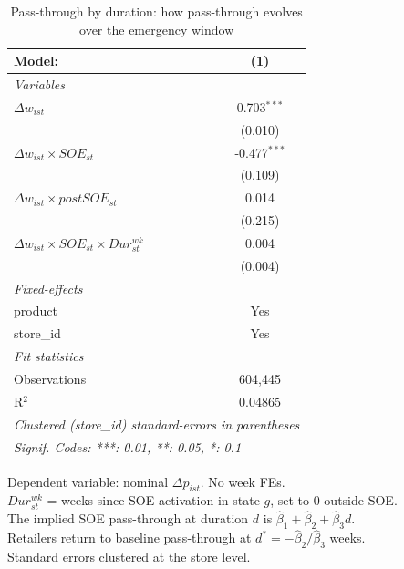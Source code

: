 
\begin{table}[htbp]
   \caption{\label{tab:passthrough_duration} Pass-through by duration: how pass-through evolves over the emergency window}
   \centering
   \begin{tabular}{lc}
      \tabularnewline \midrule \midrule
      Model:                                                   & (1)\\  
      \midrule
      \emph{Variables}\\
      $\Delta w_{ist}$                                         & 0.703$^{***}$\\   
                                                               & (0.010)\\   
      $\Delta w_{ist} \times SOE_{st}$                         & -0.477$^{***}$\\   
                                                               & (0.109)\\   
      $\Delta w_{ist} \times postSOE_{st}$                     & 0.014\\   
                                                               & (0.215)\\   
      $\Delta w_{ist} \times SOE_{st} \times Dur^{wk}_{st}$    & 0.004\\   
                                                               & (0.004)\\   
      \midrule
      \emph{Fixed-effects}\\
      product                                                  & Yes\\  
      store\_id                                                & Yes\\  
      \midrule
      \emph{Fit statistics}\\
      Observations                                             & 604,445\\  
      R$^2$                                                    & 0.04865\\  
      \midrule \midrule
      \multicolumn{2}{l}{\emph{Clustered (store\_id) standard-errors in parentheses}}\\
      \multicolumn{2}{l}{\emph{Signif. Codes: ***: 0.01, **: 0.05, *: 0.1}}\\
   \end{tabular}
   
   \par \raggedright 
   Dependent variable: nominal $\Delta p_{ist}$. No week FEs.\\
   $Dur^{wk}_{st}$ = weeks since SOE activation in state $g$, set to 0 outside SOE.\\
   The implied SOE pass-through at duration $d$ is $\hat{\beta}_1 + \hat{\beta}_2 + \hat{\beta}_3 d$.\\
   Retailers return to baseline pass-through at $d^* = -\hat{\beta}_2 / \hat{\beta}_3$ weeks.\\
   Standard errors clustered at the store level.
\end{table}


